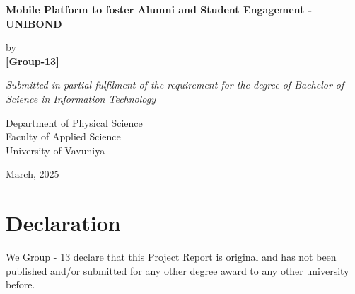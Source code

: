 \documentclass[12pt, a4paper]{report}
\begin{document}
\renewcommand\bibname{References} %


\begin{titlepage}

\begin{center}

\Large \textbf {Mobile Platform to foster Alumni and Student Engagement - UNIBOND}\\%

\vspace{1in}%


\normalsize by \\%
\vspace{1em}
\textup{\large {\bf [Group-13]}\\}
 \vspace{1in}%


 \large \emph{Submitted in partial fulfilment of the requirement
for the degree of Bachelor of Science in Information Technology}
\vspace{2.5in}




\vspace{1em}
Department of Physical Science\\
Faculty of Applied Science\\
University of Vavuniya\\




\vfill

March, 2025

\end{center}

\end{titlepage}




\cleardoublepage
{}
\chapter*{Declaration}
We Group - 13 declare that this Project Report is original and has not been published and/or submitted for any other degree award to any other university before.
\end{document}
